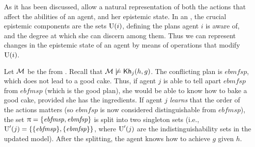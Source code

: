 As it has been discussed,  allow a natural representation of both the actions that affect the abilities of an agent, and her epistemic state. In an \ults, the crucial epistemic components are the sets $\operatorname{U}(i)$, defining the plans agent $i$ is aware of, and the degree at which she can discern among them. Thus we can represent changes in the epistemic state of
an agent by means of operations that modify $\operatorname{U}(i)$. 

\medskip

\begin{example}\label{ex:ref}
    Let $\mathcal{M}$ be the \ults from .
    Recall that $\mathcal{M}\not\models{\sf Kh}_j(h,g)$. The conflicting plan is $\mathit{ebmfsp}$, which does not lead to a good cake. Thus, if agent $j$ is able to tell apart $\mathit{ebmfsp}$ from $\mathit{ebfmsp}$ (which is the good plan), she would be able to know how to bake a good cake, provided she has the ingredients. If agent $j$ \emph{learns} that the
    order of the actions matters (so $\mathit{ebmfsp}$ is now considered distinguishable from $\mathit{ebfmsp}$), the set $\uppi=\{ \mathit{ebfmsp}, \mathit{ebmfsp} \}$ is split into two singleton sets (i.e., $\operatorname{U}'(j)=\{ \{ \mathit{ebfmsp} \},\{ \mathit{ebmfsp} \} \}$, where $\operatorname{U}'(j)$ are the indistinguishability sets in the updated model). After the splitting, the agent knows how to achieve $g$ given $h$.
\end{example}

\medskip




